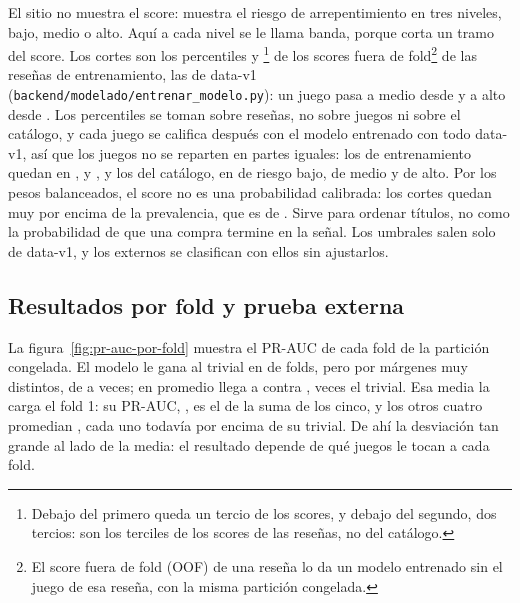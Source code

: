 El sitio no muestra el score: muestra el riesgo de arrepentimiento en tres niveles, bajo, medio o
alto. Aquí a cada nivel se le llama banda, porque corta un tramo del score. Los cortes son los
percentiles \cifraPercentilMedio{} y \cifraPercentilAlto{}\footnote{Debajo del primero queda un
tercio de los scores, y debajo del segundo, dos tercios: son los terciles de los scores de las
reseñas, no del catálogo.} de los scores fuera de
fold\footnote{El score fuera de fold (OOF) de una reseña lo da un modelo entrenado sin el juego de
esa reseña, con la misma partición congelada.} de las reseñas de entrenamiento, las de data-v1
(\texttt{backend/modelado/entrenar\_modelo.py}): un juego pasa a medio desde \cifraUmbralMedio{} y
a alto desde \cifraUmbralAlto{}. Los percentiles se toman sobre reseñas, no sobre juegos ni sobre el
catálogo, y cada juego se califica después con el modelo entrenado con todo data-v1, así que los
juegos no se reparten en partes iguales: los \cifraJuegosEntrenamiento{} de entrenamiento quedan en
\cifraBajoEntrenamiento{}, \cifraMedioEntrenamiento{} y \cifraAltoEntrenamiento{}, y los
\cifraJuegosCatalogo{} del catálogo, en \cifraBajoCatalogo{} de riesgo bajo, \cifraMedioCatalogo{}
de medio y \cifraAltoCatalogo{} de alto. Por los pesos balanceados, el
score no es una probabilidad calibrada: los cortes quedan muy por encima de la prevalencia, que es
de \cifraPrevalenciaEntrenamientoPorResena{}. Sirve para ordenar títulos, no como la probabilidad
de que una compra termine en la señal. Los umbrales salen solo de data-v1, y los
\cifraJuegosExternos{} externos se clasifican con ellos sin ajustarlos.

\subsection{Resultados por fold y prueba externa}\label{sec:evaluacion}\label{sec:evaluacion-folds}\label{sec:evaluacion-externa}

La figura~\ref{fig:pr-auc-por-fold} muestra el PR-AUC de cada fold de la partición congelada. El
modelo le gana al trivial en \cifraPliegosGanados{} de \cifraPliegues{} folds, pero por márgenes
muy distintos, de \cifraCocienteFoldMin{} a \cifraCocienteFoldMax{} veces; en promedio llega a
\cifraPRAUCModelo{} contra \cifraPRAUCTrivial{}, \cifraPRAUCCociente{} veces el trivial. Esa media
la carga el fold 1: su PR-AUC, \cifraPRAUCFoldUno{}, es el \cifraFoldUnoParteDeLaSuma{} de la suma
de los cinco, y los otros cuatro promedian \cifraPRAUCOtrosFolds{}, cada uno todavía por encima de
su trivial. De ahí la desviación tan grande
al lado de la media: el resultado depende de qué juegos le tocan a cada fold.

